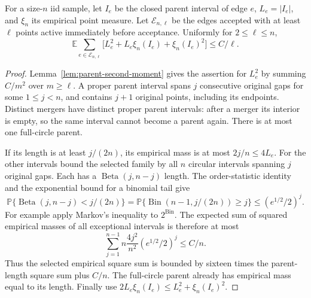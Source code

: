 \documentclass[11pt,letterpaper]{article}
\newcommand{\PP}{\mathbb P}\newcommand{\EE}{\mathbb E}
\begin{document}
\begin{lemma}
\label{lem:tagged-parent-tail}
For a size-$n$ iid sample, let $I_e$ be the closed parent interval of
edge $e$, $L_e=|I_e|$, and $\xi_n$ its empirical point measure.
Let $\mathcal E_{n,\ell}$ be the edges accepted with at least $\ell$
points active immediately before acceptance. Uniformly for
$2\le\ell\le n$,
\begin{equation}\label{eq:tagged-parent-tail}
 \EE\sum_{e\in\mathcal E_{n,\ell}}
       \bigl[L_e^2+L_e\xi_n(I_e)+\xi_n(I_e)^2\bigr]\le C/\ell.
\end{equation}
\end{lemma}
\begin{proof}
Lemma~\ref{lem:parent-second-moment} gives the assertion for $L_e^2$
by summing $C/m^2$ over $m\ge\ell$.
A proper parent interval spans $j$ consecutive original gaps for
some $1\le j<n$, and contains $j+1$ original points, including its
endpoints. Distinct mergers have distinct proper parent intervals:
after a merger its interior is empty, so the same interval cannot
become a parent again. There is at most one full-circle parent.

If its length is at least $j/(2n)$, its empirical mass is at most
$2j/n\le4L_e$. For the other intervals bound the selected family by
all $n$ circular intervals spanning $j$ original gaps. Each has a
$\operatorname{Beta}(j,n-j)$ length. The order-statistic identity
and the exponential bound for a binomial tail give
\[
 \PP\{\operatorname{Beta}(j,n-j)<j/(2n)\}
 =\PP\{\operatorname{Bin}(n-1,j/(2n))\ge j\}
 \le (e^{1/2}/2)^j.
\]
For example apply Markov's inequality to $2^{\operatorname{Bin}}$.
The expected sum of squared empirical masses of all exceptional
intervals is therefore at most
\[
 \sum_{j=1}^{n-1}n\frac{4j^2}{n^2}(e^{1/2}/2)^j\le C/n.
\]
Thus the selected empirical square sum is bounded by sixteen times
the parent-length square sum plus $C/n$. The full-circle parent
already has empirical mass equal to its length. Finally use
$2L_e\xi_n(I_e)\le L_e^2+\xi_n(I_e)^2$.
\end{proof}
\end{document}
